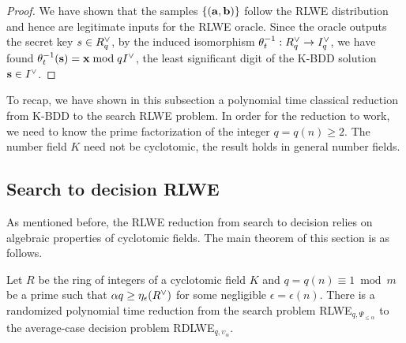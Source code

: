 \documentclass[../main.tex]{subfiles}
\begin{document}
\begin{proof}
We have shown that the samples $\{(\mathbf{a},\mathbf{b})\}$ follow the RLWE distribution and hence are legitimate inputs for the RLWE oracle. Since the oracle outputs the secret key $s \in R^{\vee}_q$, by the induced isomorphism $\theta^{-1}_t: R^{\vee}_q \rightarrow I^{\vee}_q$, we have found $\theta^{-1}_t(\mathbf{s})=\mathbf{x} \bmod qI^{\vee}$, the least significant digit of the K-BDD solution $\mathbf{s} \in I^{\vee}$.
\end{proof}

To recap, we have shown in this subsection a polynomial time classical reduction from K-BDD to the search RLWE problem. In order for the reduction to work, we need to know the prime factorization of the integer $q = q(n) \ge 2$. The number field $K$ need not be cyclotomic, the result holds in general number fields.



\subsection{Search to decision RLWE}

As mentioned before, the RLWE reduction from search to decision relies on algebraic properties of cyclotomic fields. 
The main theorem of this section is as follows. 

\begin{theorem}
\label{thm:rlweSearchToDecision}
Let $R$ be the ring of integers of a cyclotomic field $K$ and $q=q(n) \equiv 1 \bmod m$ be a prime such that $\alpha q \ge \eta_{\epsilon}(R^{\vee})$ for some negligible $\epsilon=\epsilon(n)$. There is a randomized polynomial time reduction from the search problem RLWE$_{q,\Psi_{\le \alpha}}$ to the average-case decision problem RDLWE$_{q,\upsilon_{\alpha}}$. 
\end{theorem}

\end{document}
